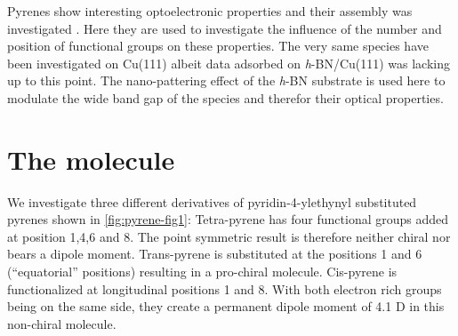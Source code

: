 Pyrenes show interesting optoelectronic properties \cite{Crawford_experimental_2011, Lee_enhanced_2012, Feng_functionalization_2016, Maeda_alkynylpyrenes_2006, Kurata_donor_2017} and their assembly was investigated \cite{pham_self-assembly_2014, matena_aggregation_2010, della_pia_anomalous_2014, pham_comparing_2016}. Here they are used to investigate the influence of the number and position of functional groups on these properties. The very same species have been investigated on Cu(111) albeit data adsorbed on \textit{h}-BN/Cu(111) was lacking up to this point. The nano-pattering effect of the \textit{h}-BN substrate is used here to modulate the wide band gap of the species and therefor their optical properties.

\section{The molecule}

We investigate three different derivatives of pyridin-4-ylethynyl substituted pyrenes shown in \autoref{fig:pyrene-fig1}:  Tetra-pyrene has four functional groups added at position 1,4,6 and 8. The point symmetric result is therefore neither chiral nor bears a dipole moment.  Trans-pyrene is substituted at the positions 1 and 6 (“equatorial” positions) resulting in a pro-chiral molecule.  Cis-pyrene is functionalized at longitudinal positions 1 and 8. With both electron rich groups being on the same side, they create a permanent dipole moment of 4.1 D in this non-chiral molecule.

